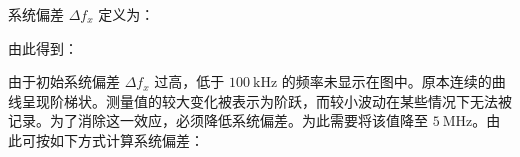 系统偏差 $\Delta f_x$ 定义为：

由此得到：

由于初始系统偏差 $\Delta f_x$ 过高，低于 $\SI{100}{\kilo\hertz}$ 的频率未显示在图中。原本连续的曲线呈现阶梯状。测量值的较大变化被表示为阶跃，而较小波动在某些情况下无法被记录。为了消除这一效应，必须降低系统偏差。为此需要将该值降至 $\SI{5}{\mega\hertz}$。由此可按如下方式计算系统偏差：
